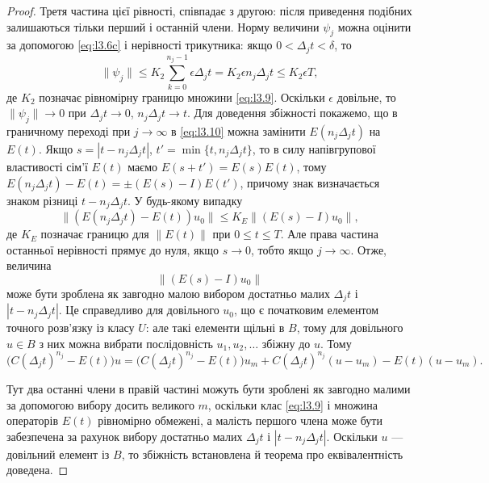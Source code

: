 \begin{proof}
    Третя частина цієї рівності, співпадає з другою: після приведення подібних залишаються тільки перший і останній члени. Норму величини $\psi_j$ можна оцінити за допомогою \eqref{eq:l3.6c} і нерівності трикутника: якщо $0 < \Delta_j t < \delta$, то
    \begin{equation}
        \label{eq:l3.11}
        \|\psi_j\| \le K_2 \sum_{k = 0}^{n_j - 1} \epsilon \Delta_j t = K_2 \epsilon n_j \Delta_j t \le K_2 \epsilon T,
    \end{equation}
    де $K_2$ позначає рівномірну границю множини \eqref{eq:l3.9}. Оскільки $\epsilon$ довільне, то $\|\psi_j\| \to 0$ при $\Delta_j t \to 0$, $n_j \Delta_j t \to t$. Для доведення збіжності покажемо, що в граничному переході при $j \to \infty$ в \eqref{eq:l3.10} можна замінити $E(n_j \Delta_j t)$ на $E(t)$. Якщо $s = |t - n_j \Delta_j t|$, $t' = \min\{t, n_j \Delta_j t\}$, то в силу напівгрупової властивості сім'ї $E(t)$ маємо $E(s + t') = E(s) E(t)$, тому $E(n_j \Delta_j t) - E(t) = \pm (E(s) - I) E(t')$, причому знак визначається знаком різниці $t - n_j \Delta_j t$. У будь-якому випадку
    \begin{equation}
        \| (E(n_j \Delta_j t) - E(t)) u_0 \| \le K_E \| (E(s) - I) u_0 \|,
    \end{equation}
    де $K_E$ позначає границю для $\|E(t)\|$ при $0 \le t \le T$. Але права частина останньої нерівності прямує до нуля, якщо $s \to 0$, тобто якщо $j \to \infty$. Отже, величина 
    \begin{equation}
        \| (E(s) - I) u_0 \|
    \end{equation}
    може бути зроблена як завгодно малою вибором достатньо малих $\Delta_j t$ і $|t - n_j \Delta_j t|$. Це справедливо для довільного $u_0$, що є початковим елементом точного розв'язку із класу $U$: але такі елементи щільні в $B$, тому для довільного $u \in B$ з них можна вибрати послідовність $u_1, u_2, \ldots$ збіжну до $u$. Тому
    \begin{equation}
        \label{eq:l3.12}
        \Big( C(\Delta_j t)^{n_j} - E(t) \Big) u = \Big( C(\Delta_j t)^{n_j} - E(t) \Big) u_m + C(\Delta_j t)^{n_j} (u - u_m) - E(t) (u - u_m).
    \end{equation}
    
    Тут два останні члени в правій частині можуть бути зроблені як завгодно малими за допомогою вибору досить великого $m$, оскільки клас \eqref{eq:l3.9} і множина операторів $E(t)$ рівномірно обмежені, а малість першого члена може бути забезпечена за рахунок вибору достатньо малих $\Delta_j t$ і $|t - n_j \Delta_j t|$. Оскільки $u$ --- довільний елемент із $B$, то збіжність встановлена й теорема про еквівалентність доведена.
\end{proof}

